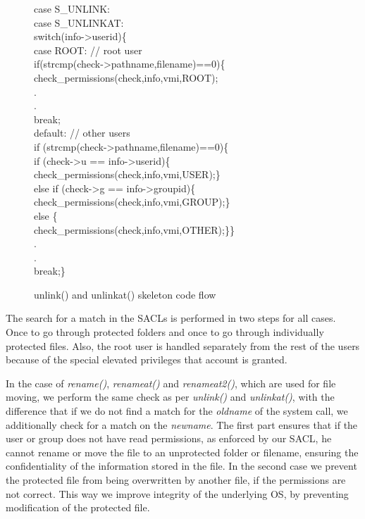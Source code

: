 \begin{figure}[ht]
\footnotesize {
	{\selectfont 
case S\_UNLINK:\\          
case S\_UNLINKAT:\\
\tab  switch(info->userid)\{\\
\tab \tab case ROOT: // root user\\
\tab \tab \tab 	if(strcmp(check->pathname,filename)==0)\{\\
\tab \tab \tab \tab 		check\_permissions(check,info,vmi,ROOT);\\			
\tab .\\
\tab .\\
\tab \tab \tab break;\\
\tab \tab default: // other users\\
\tab \tab \tab if (strcmp(check->pathname,filename)==0)\{\\
\tab \tab \tab \tab if (check->u == info->userid)\{\\
\tab \tab \tab \tab \tab check\_permissions(check,info,vmi,USER);\}\\
\tab \tab \tab \tab else if (check->g == info->groupid)\{\\
\tab \tab \tab \tab \tab check\_permissions(check,info,vmi,GROUP);\}\\
\tab \tab \tab else \{\\
\tab \tab \tab \tab check\_permissions(check,info,vmi,OTHER);\}\}\\
\tab .\\
\tab .\\
\tab \tab \tab break;\}}}
	\caption{unlink() and unlinkat() skeleton code flow}
	\label{fig:unlink}
\end{figure}

\par The search for a match in the \ac{SACL}s is performed in two steps for all cases. Once to go through protected folders and once to go through individually protected files. Also, the root user is handled separately from the rest of the users because of the special elevated privileges that account is granted. 

\par In the case of \textit{rename()}, \textit{renameat()} and \textit{renameat2()}, which are used for file moving, we perform the same check as per \textit{unlink()} and \textit{unlinkat()}, with the difference that if we do not find a match for the \textit{oldname} of the system call, we additionally check for a match on the \textit{newname}. The first part ensures that if the user or group does not have read permissions, as enforced by our \ac{SACL}, he cannot rename or move the file to an unprotected folder or filename, ensuring the confidentiality of the information stored in the file. In the second case we prevent the protected file from being overwritten by another file, if the permissions are not correct. This way we improve integrity of the underlying \ac{OS}, by preventing modification of the protected file. 

